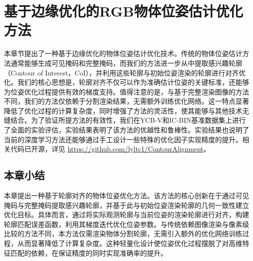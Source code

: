 \chapter{基于边缘优化的RGB物体位姿估计优化方法}

本章节提出了一种基于边缘优化的物体位姿估计优化技术。传统的物体位姿估计方法通常能够生成可见掩码和完整掩码，而我们的方法进一步从中提取感兴趣轮廓（Contour of Interest，CoI），并利用这些轮廓与初始位姿渲染的轮廓进行对齐优化。我们的核心思想是，轮廓对齐不仅可以作为准确估计位姿的关键标准，还能够为位姿优化过程提供有效的梯度支持。值得注意的是，与基于完整渲染图像的方法不同，我们的方法仅依赖于分割渲染结果，无需额外训练优化网络。这一特点显著降低了优化过程的计算复杂度，同时增强了方法的灵活性，使其能够与其他技术无缝结合。为了验证所提方法的有效性，我们在YCB-V和IC-BIN基准数据集上进行了全面的实验评估，实验结果表明了该方法的优越性和鲁棒性。实验结果也说明了当前的深度学习方法还能够通过手工设计一些特殊的优化因子实现精度的提升。相关代码已开源，详见 \href{https://github.com/lyltc1/ContourAlignment}{https://github.com/lyltc1/ContourAlignment}。


\section{本章小结}
本章提出一种基于轮廓对齐的物体位姿优化方法。该方法的核心创新在于通过可见掩码与完整掩码提取感兴趣轮廓，并基于此与初始位姿渲染轮廓的几何一致性建立优化目标。具体而言，通过将实际观测轮廓与当前位姿的渲染轮廓进行对齐，构建轮廓匹配误差函数，利用其梯度迭代优化位姿参数。与传统依赖图像渲染与像素级比较的方法不同，本方法仅需渲染物体分割轮廓，无需引入额外的优化网络训练过程，从而显著降低了计算复杂度。这种轻量化设计使位姿优化过程摆脱了对高维特征匹配的依赖，在保证精度的同时实现准确率的提升。